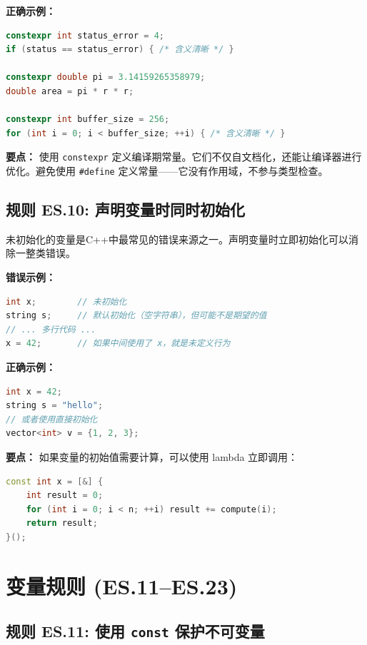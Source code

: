 \textbf{正确示例：}

\begin{lstlisting}[language=C++]
constexpr int status_error = 4;
if (status == status_error) { /* 含义清晰 */ }

constexpr double pi = 3.14159265358979;
double area = pi * r * r;

constexpr int buffer_size = 256;
for (int i = 0; i < buffer_size; ++i) { /* 含义清晰 */ }
\end{lstlisting}

\textbf{要点：} 使用 \texttt{constexpr} 定义编译期常量。它们不仅自文档化，还能让编译器进行优化。避免使用 \texttt{\#define} 定义常量——它没有作用域，不参与类型检查。

\subsection*{\textbf{规则 ES.10:} 声明变量时同时初始化}

未初始化的变量是C++中最常见的错误来源之一。声明变量时立即初始化可以消除一整类错误。

\textbf{错误示例：}

\begin{lstlisting}[language=C++]
int x;        // 未初始化
string s;     // 默认初始化（空字符串），但可能不是期望的值
// ... 多行代码 ...
x = 42;       // 如果中间使用了 x，就是未定义行为
\end{lstlisting}

\textbf{正确示例：}

\begin{lstlisting}[language=C++]
int x = 42;
string s = "hello";
// 或者使用直接初始化
vector<int> v = {1, 2, 3};
\end{lstlisting}

\textbf{要点：} 如果变量的初始值需要计算，可以使用 lambda 立即调用：
\begin{lstlisting}[language=C++]
const int x = [&] {
    int result = 0;
    for (int i = 0; i < n; ++i) result += compute(i);
    return result;
}();
\end{lstlisting}

\section{变量规则 (ES.11--ES.23)}

\subsection*{\textbf{规则 ES.11:} 使用 \texttt{const} 保护不可变量}

